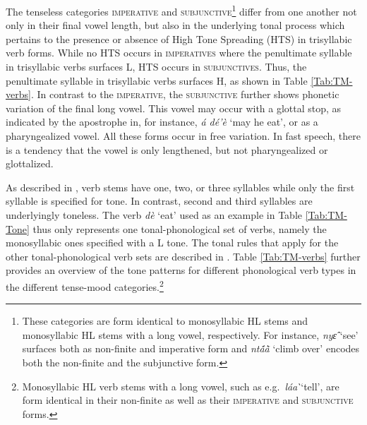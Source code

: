 The tenseless categories \textsc{imperative} and \textsc{subjunctive}\footnote{These categories are form identical to monosyllabic HL stems and monosyllabic HL stems with a long vowel, respectively. For instance, {\itshape nyɛ̂} `see' surfaces both as non-finite and imperative form and {\itshape ntã́ã̀} `climb over' encodes both the non-finite and the subjunctive form.} differ from one another not only in their final vowel length, but also in the underlying tonal process which pertains to the presence or absence of High Tone Spreading (HTS) in trisyllabic verb forms. While no HTS occurs in \textsc{imperatives} where the penultimate syllable in trisyllabic verbs surfaces L, HTS occurs in \textsc{subjunctives}. Thus, the penultimate syllable in trisyllabic verbs surfaces H, as shown in Table \ref{Tab:TM-verbs}. In contrast to the \textsc{imperative}, the \textsc{subjunctive} further shows phonetic variation of the final long vowel. This vowel may occur with a glottal stop, as indicated by the apostrophe in, for instance, {\itshape á dé'è} `may he eat', or as a pharyngealized vowel. All these forms occur in free variation. In fast speech, there is a tendency that the vowel is only lengthened, but not pharyngealized or glottalized.


As described in , verb stems have one, two, or three syllables while only the first syllable is specified for tone. In contrast, second and third syllables are underlyingly toneless. The verb {\itshape dè} `eat' used as an example in Table \ref{Tab:TM-Tone} thus only represents one tonal-phonological set of verbs, namely the monosyllabic ones specified with a L tone.  The tonal rules that apply for the other tonal-phonological verb sets are described in . Table \ref{Tab:TM-verbs} further provides an overview of the tone patterns for different phonological verb types in the different tense-mood categories.\footnote{Monosyllabic HL verb stems with a long vowel, such as e.g.\ {\itshape láa ̀}`tell', are form identical in their non-finite as well as their \textsc{imperative} and \textsc{subjunctive} forms.}



